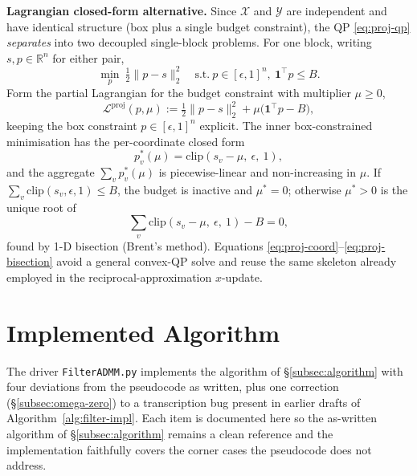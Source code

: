\documentclass[11pt]{article}
\newcommand{\stn}{\text{s.t.}}
\begin{document}
\begin{enumerate}
\medskip
\noindent\textbf{Lagrangian closed-form alternative.}
Since $\mathcal{X}$ and $\mathcal{Y}$ are independent and have identical structure (box plus a single budget constraint), the QP \eqref{eq:proj-qp} \emph{separates} into two decoupled single-block problems. For one block, writing $s, p \in \mathbb{R}^n$ for either pair,
\begin{equation}\label{eq:proj-block}
  \min_{p}\ \tfrac{1}{2}\|p - s\|_2^2 \quad \stn\ p \in [\epsilon,1]^n,\ \mathbf{1}^\top p \leq B.
\end{equation}
Form the partial Lagrangian for the budget constraint with multiplier $\mu \geq 0$,
\begin{equation}\label{eq:proj-lagrangian}
  \mathcal{L}^{\mathrm{proj}}(p,\mu) := \tfrac{1}{2}\|p - s\|_2^2 + \mu\bigl(\mathbf{1}^\top p - B\bigr),
\end{equation}
keeping the box constraint $p \in [\epsilon,1]^n$ explicit. The inner box-constrained minimisation has the per-coordinate closed form
\begin{equation}\label{eq:proj-coord}
  p^\ast_v(\mu) = \mathrm{clip}\!\left(s_v - \mu,\ \epsilon,\ 1\right),
\end{equation}
and the aggregate $\sum_v p^\ast_v(\mu)$ is piecewise-linear and non-increasing in $\mu$. If $\sum_v \mathrm{clip}(s_v,\epsilon,1) \leq B$, the budget is inactive and $\mu^\ast = 0$; otherwise $\mu^\ast > 0$ is the unique root of
\begin{equation}\label{eq:proj-bisection}
  \sum_{v} \mathrm{clip}\!\left(s_v - \mu,\ \epsilon,\ 1\right) - B = 0,
\end{equation}
found by 1-D bisection (Brent's method). Equations \eqref{eq:proj-coord}--\eqref{eq:proj-bisection} avoid a general convex-QP solve and reuse the same skeleton already employed in the reciprocal-approximation $x$-update.
\end{enumerate}

\section{Implemented Algorithm}\label{sec:implemented}

The driver \texttt{FilterADMM.py} implements the algorithm of \S\ref{subsec:algorithm} with four deviations from the pseudocode as written, plus one correction (\S\ref{subsec:omega-zero}) to a transcription bug present in earlier drafts of Algorithm~\ref{alg:filter-impl}. Each item is documented here so the as-written algorithm of \S\ref{subsec:algorithm} remains a clean reference and the implementation faithfully covers the corner cases the pseudocode does not address.
\end{document}
